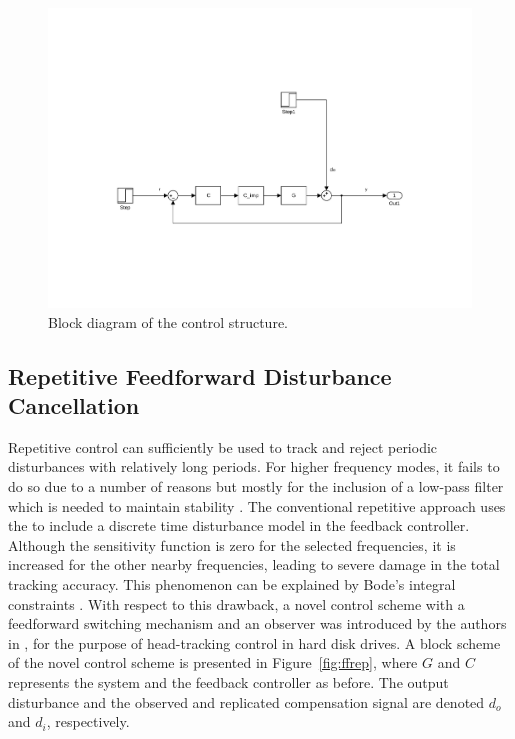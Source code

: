 \begin{figure}[h]
  \centering %
  \includegraphics[width=1\textwidth, trim=6.5cm 5.5cm 5.97cm 11cm, clip=true]{fig/matlab/imp}
  \caption{\label{fig:imp}Block diagram of the \abbrIMP control structure.}
\end{figure}

\subsection{Repetitive Feedforward Disturbance Cancellation}
Repetitive control can sufficiently be used to track and reject periodic disturbances with relatively long periods. For higher frequency modes, it fails to do so due to a number of reasons but mostly for the inclusion of a low-pass filter which is needed to maintain stability \citep{fujimoto2009rro}. The conventional repetitive approach uses the \abbrIMP to include a discrete time disturbance model in the feedback controller. Although the sensitivity function is zero for the selected frequencies, it is increased for the other nearby frequencies, leading to severe damage in the total tracking accuracy. This phenomenon can be explained by Bode's integral constraints \citep{Ljung:2003}. With respect to this drawback, a novel control scheme with a feedforward switching mechanism and an observer was introduced by the authors in \citep{fujimoto2004repetitive}, for the purpose of head-tracking control in hard disk drives. A block scheme of the novel control scheme is presented in Figure~\ref{fig:ffrep}, where $G$ and $C$ represents the system and the feedback controller as before. The output disturbance and the observed and replicated compensation signal are denoted $d_o$ and $d_i$, respectively.

